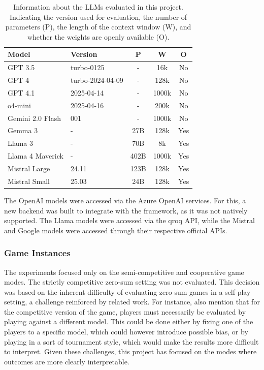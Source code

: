 \begin{table}[ht]
  \centering
  \small
  \setlength{\tabcolsep}{5pt}
  \begin{tabular}{llccc}
    \hline
    Model & Version & P & W & O \\
    \hline
    GPT 3.5 & turbo-0125 & - & 16k & No \\
    GPT 4 & turbo-2024-04-09 & - & 128k & No \\
    GPT 4.1 & 2025-04-14 & - & 1000k & No \\
    o4-mini & 2025-04-16 & - & 200k & No \\
    Gemini 2.0 Flash & 001 & - & 1000k & No \\
    Gemma 3 & - & 27B & 128k & Yes \\
    Llama 3 & - & 70B & 8k & Yes \\
    Llama 4 Maverick & - & 402B & 1000k & Yes \\
    Mistral Large & 24.11 & 123B & 128k & Yes \\
    Mistral Small & 25.03 & 24B & 128k & Yes \\
    \hline
  \end{tabular}
  \caption{Information about the LLMs evaluated in this project. Indicating the version used for evaluation, the number of parameters (P), the length of the context window (W), and whether the weights are openly available (O).}
  \label{tab:llms}
\end{table}

The OpenAI models were accessed via the Azure OpenAI services. For this, a new backend was built to integrate with the  framework, as it was not natively supported. The Llama models were accessed via the qroq API, while the Mistral and Google models were accessed through their respective official APIs.


\subsubsection{Game Instances}

The experiments focused only on the semi-competitive and cooperative game modes. The strictly competitive zero-sum setting was not evaluated. This decision was based on the inherent difficulty of evaluating zero-sum games in a self-play setting, a challenge reinforced by related work. For instance, \cite{liao2024efficacy} also mention that for the competitive version of the game, players must necessarily be evaluated by playing against a different model. This could be done either by fixing one of the players to a specific model, which could however introduce possible bias, or by playing in a sort of tournament style, which would make the results more difficult to interpret. Given these challenges, this project has focused on the modes where outcomes are more clearly interpretable.

